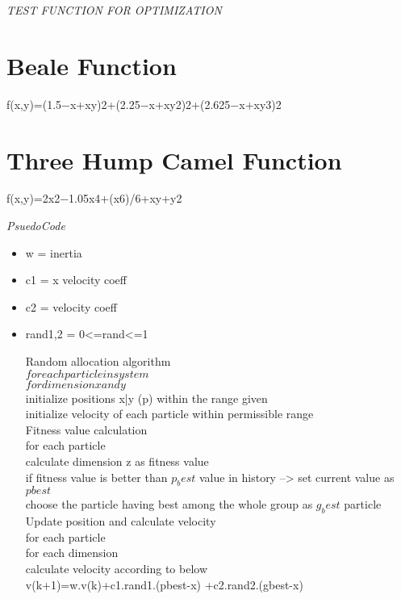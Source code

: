 \documentclass{article}
\begin{document}
\begin{center}
\begin{center}
\begin{center}
\begin{minipage}{33em}
\noindent
\emph{\LARGE TEST FUNCTION FOR OPTIMIZATION}\\
\vspace{0.10in}
\noindent
\section{\small Beale Function}

f(x,y)=(1.5−x+xy)2+(2.25−x+xy2)2+(2.625−x+xy3)2

\section{\small Three Hump Camel Function}
f(x,y)=2x2−1.05x4+(x6)/6+xy+y2

\vspace{0.75in}
\noindent
\emph{\LARGE PsuedoCode }\\[0.5cm]
\begin{itemize}
  \item w = inertia
  \item c1 = x velocity coeff
  \item c2 = velocity coeff
  \item rand1,2 = 0<=rand<=1
 
        Random allocation algorithm
    \\[2pt]
		$\! for each particle in system $
		\\[2pt]
	 $\!for dimension x and y$
	 \\[2pt]
	 initialize positions x|y (p) within the range given 
	 \\[2pt]
	 initialize velocity of each particle within permissible range
	 \\[2pt]
	Fitness value calculation
	\\[2pt]
		 for each particle
		 \\[2pt]
		 calculate dimension z as fitness value
		 \\[2pt]
			 if fitness value is better than $p_best$ value in history --> set current value as $pbest$
			 \\[2pt]
		choose the particle having best among the whole group as $g_best$ particle
		\\[2pt]
			
	Update position and calculate velocity
	\\[2pt]
		for each particle
		\\[2pt]
			 for each dimension
			 \\[2pt]
				 calculate velocity according to below
				 \\[2pt]
					 v(k+1)=w.v(k)+c1.rand1.(pbest-x) +c2.rand2.(gbest-x)
					 \\[2pt]


\end{itemize}
\end{minipage}
\end{center}
\end{center}
\end{center}
\end{document}
